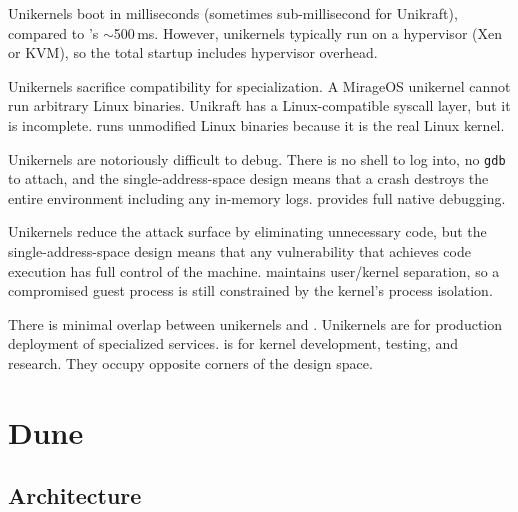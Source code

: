 \begin{description}[style=nextline,leftmargin=2em]
  \item[Boot time.]
    Unikernels boot in milliseconds (sometimes sub-millisecond for
    Unikraft), compared to \UML{}'s $\sim$500\,ms.  However,
    unikernels typically run on a hypervisor (Xen or KVM), so the
    total startup includes hypervisor overhead.

  \item[Compatibility.]
    Unikernels sacrifice compatibility for specialization.  A
    MirageOS unikernel cannot run arbitrary Linux binaries.  Unikraft
    has a Linux-compatible syscall layer, but it is incomplete.
    \UML{} runs unmodified Linux binaries because it is the real
    Linux kernel.

  \item[Debugging.]
    Unikernels are notoriously difficult to debug.  There is no
    shell to log into, no \texttt{gdb} to attach, and the
    single-address-space design means that a crash destroys the
    entire environment including any in-memory logs.  \UML{} provides
    full native debugging.

  \item[Security model.]
    Unikernels reduce the attack surface by eliminating unnecessary
    code, but the single-address-space design means that any
    vulnerability that achieves code execution has full control
    of the machine.  \UML{} maintains user/kernel separation,
    so a compromised guest process is still constrained by the
    \UML{} kernel's process isolation.

  \item[Use case overlap.]
    There is minimal overlap between unikernels and \UML{}.
    Unikernels are for production deployment of specialized services.
    \UML{} is for kernel development, testing, and research.  They
    occupy opposite corners of the design space.
\end{description}


\section{Dune}
\label{sec:related-dune}

\subsection{Architecture}

